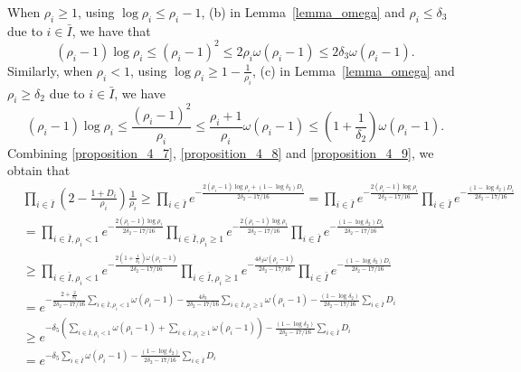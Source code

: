 \documentclass[11pt,letterpaper]{article}
\newcommand\0{{\Vector{0}}}
\newcommand\1{{\Vector{1}}}
\numberwithin{assumption}{section}
\numberwithin{definition}{section}
\numberwithin{theorem}{section}
\numberwithin{remark}{section}
\begin{document}
    When $\rho_i \geq 1$, using $\log{\rho_i} \leq \rho_i - 1$, (b) in Lemma~\ref{lemma_omega} and $\rho_i \leq \delta_3$ due to $i \in \bar{I}$, we have that
    \begin{equation}\label{proposition_4_8}
        (\rho_i - 1)\log{\rho_i} \leq (\rho_i - 1)^2 \leq 2\rho_i\omega(\rho_i - 1) \leq 2\delta_3\omega(\rho_i - 1).
    \end{equation}
    Similarly, when $\rho_i < 1$, using $\log{\rho_i} \geq 1 - \frac{1}{\rho_i}$, (c) in Lemma~\ref{lemma_omega} and $\rho_i \geq \delta_2$ due to $i \in \bar{I}$, we have
    \begin{equation}\label{proposition_4_9}
        (\rho_i - 1)\log{\rho_i} \leq \frac{(\rho_i - 1)^2}{\rho_i} \leq \frac{\rho_i + 1}{\rho_i}\omega(\rho_i - 1) \leq (1 + \frac{1}{\delta_2})\omega(\rho_i - 1).
    \end{equation}
    Combining \eqref{proposition_4_7}, \eqref{proposition_4_8} and \eqref{proposition_4_9}, we obtain that
    \begin{equation}\label{proposition_4_10}
    \begin{split}
        & \prod_{i \in \bar{I}}(2 - \frac{1 + D_i}{\rho_i})\frac{1}{\rho_i} \geq \prod_{i \in \bar{I}}e^{-\frac{2(\rho_i - 1)\log{\rho_i} + (1 - \log{\delta_2})D_i}{2\delta_2 - 17/16}} = \prod_{i \in \bar{I}}e^{-\frac{2(\rho_i - 1)\log{\rho_i}}{2\delta_2 - 17/16}} \prod_{i \in \bar{I}}e^{-\frac{(1 - \log{\delta_2})D_i}{2\delta_2 - 17/16}} \\
        & = \prod_{i \in \bar{I}, \rho_i < 1}e^{-\frac{2(\rho_i - 1)\log{\rho_i}}{2\delta_2 - 17/16}} \prod_{i \in \bar{I}, \rho_i \geq 1}e^{-\frac{2(\rho_i - 1)\log{\rho_i}}{2\delta_2 - 17/16}} \prod_{i \in \bar{I}}e^{-\frac{(1 - \log{\delta_2})D_i}{2\delta_2 - 17/16}} \\
        & \geq \prod_{i \in \bar{I}, \rho_i < 1}e^{-\frac{2(1 + \frac{1}{\delta_2})\omega(\rho_i - 1)}{2\delta_2 - 17/16}} \prod_{i \in \bar{I}, \rho_i \geq 1}e^{-\frac{4\delta_3\omega(\rho_i - 1)}{2\delta_2 - 17/16}} \prod_{i \in \bar{I}}e^{-\frac{(1 - \log{\delta_2})D_i}{2\delta_2 - 17/16}} \\
        & = e^{- \frac{2 + \frac{2}{\delta_2}}{2\delta_2 - 17/16}\sum_{i \in \bar{I}, \rho_i < 1}\omega(\rho_i - 1) - \frac{4\delta_3}{2\delta_2 - 17/16}\sum_{i \in \bar{I}, \rho_i \geq 1}\omega(\rho_i - 1) - \frac{(1 - \log{\delta_2})}{2\delta_2 - 17/16}\sum_{i \in \bar{I}}D_i} \\
        & \geq e^{- \delta_5\left(\sum_{i \in \bar{I}, \rho_i < 1}\omega(\rho_i - 1) + \sum_{i \in \bar{I}, \rho_i \geq 1}\omega(\rho_i - 1)\right) - \frac{(1 - \log{\delta_2})}{2\delta_2 - 17/16}\sum_{i \in \bar{I}}D_i} \\
        & = e^{- \delta_5\sum_{i \in \bar{I}}\omega(\rho_i - 1) - \frac{(1 - \log{\delta_2})}{2\delta_2 - 17/16}\sum_{i \in \bar{I}}D_i}
    \end{split}
    \end{equation}
\end{document}

